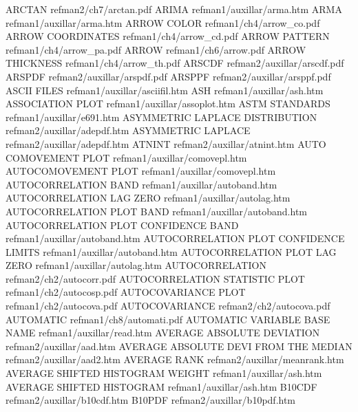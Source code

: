 ARCTAN                                  refman2/ch7/arctan.pdf
ARIMA                                   refman1/auxillar/arma.htm
ARMA                                    refman1/auxillar/arma.htm
ARROW COLOR                             refman1/ch4/arrow_co.pdf
ARROW COORDINATES                       refman1/ch4/arrow_cd.pdf
ARROW PATTERN                           refman1/ch4/arrow_pa.pdf
ARROW                                   refman1/ch6/arrow.pdf
ARROW THICKNESS                         refman1/ch4/arrow_th.pdf
ARSCDF                                  refman2/auxillar/arscdf.pdf
ARSPDF                                  refman2/auxillar/arspdf.pdf
ARSPPF                                  refman2/auxillar/arsppf.pdf
ASCII FILES                             refman1/auxillar/asciifil.htm
ASH                                     refman1/auxillar/ash.htm
ASSOCIATION PLOT                        refman1/auxillar/assoplot.htm
ASTM STANDARDS                          refman1/auxillar/e691.htm
ASYMMETRIC LAPLACE DISTRIBUTION         refman2/auxillar/adepdf.htm
ASYMMETRIC LAPLACE                      refman2/auxillar/adepdf.htm
ATNINT                                  refman2/auxillar/atnint.htm
AUTO COMOVEMENT PLOT                    refman1/auxillar/comovepl.htm
AUTOCOMOVEMENT PLOT                     refman1/auxillar/comovepl.htm
AUTOCORRELATION BAND                    refman1/auxillar/autoband.htm
AUTOCORRELATION LAG ZERO                refman1/auxillar/autolag.htm
AUTOCORRELATION PLOT BAND               refman1/auxillar/autoband.htm
AUTOCORRELATION PLOT CONFIDENCE BAND    refman1/auxillar/autoband.htm
AUTOCORRELATION PLOT CONFIDENCE LIMITS  refman1/auxillar/autoband.htm
AUTOCORRELATION PLOT LAG ZERO           refman1/auxillar/autolag.htm
AUTOCORRELATION                         refman2/ch2/autocorr.pdf
AUTOCORRELATION STATISTIC PLOT          refman1/ch2/autocosp.pdf
AUTOCOVARIANCE PLOT                     refman1/ch2/autocova.pdf
AUTOCOVARIANCE                          refman2/ch2/autocova.pdf
AUTOMATIC                               refman1/ch8/automati.pdf
AUTOMATIC VARIABLE BASE NAME            refman1/auxillar/read.htm
AVERAGE ABSOLUTE DEVIATION              refman2/auxillar/aad.htm
AVERAGE ABSOLUTE DEVI FROM THE MEDIAN   refman2/auxillar/aad2.htm
AVERAGE RANK                            refman2/auxillar/meanrank.htm
AVERAGE SHIFTED HISTOGRAM WEIGHT        refman1/auxillar/ash.htm
AVERAGE SHIFTED HISTOGRAM               refman1/auxillar/ash.htm
B10CDF                                  refman2/auxillar/b10cdf.htm
B10PDF                                  refman2/auxillar/b10pdf.htm
